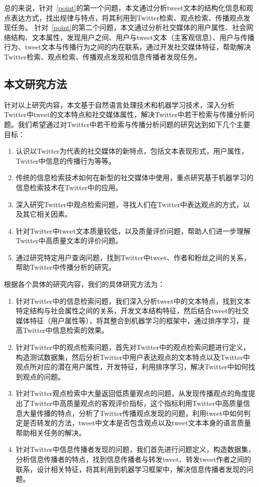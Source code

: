 总的来说，针对~\ref{point}的第一个问题，本文通过分析tweet文本的结构化信息和观点表达方式，找出规律与特点，将其利用到Twitter检索、观点检索、传播观点发现任务。
针对~\ref{point}的第二个问题，本文通过分析社交媒体的用户属性、社会网络结构、文本属性，发现用户之间、用户与tweet文本（主客观信息）、用户与传播行为、tweet文本与传播行为之间的内在联系，通过开发社交媒体特征，帮助解决Twitter检索、观点检索、传播观点发现和信息传播者发现任务。

\subsection{本文研究方法}
针对以上研究内容，本文基于自然语言处理技术和机器学习技术，深入分析Twitter中tweet的文本特点和社交媒体属性，解决Twitter中若干检索与传播分析问题。我们希望通过对Twitter中若干检索与传播分析问题的研究达到如下几个主要目标：
\begin{enumerate}
\item 认识以Twitter为代表的社交媒体的新特点，包括文本表现形式，用户属性，Twitter中信息的传播行为等等。
\item 传统的信息检索技术如何在新型的社交媒体中使用，重点研究基于机器学习的信息检索技术在Twitter中的应用。
\item 深入研究Twitter中观点检索问题，寻找人们在Twitter中表达观点的方式，以及其它相关因素。
\item 针对Twitter中tweet文本质量较低，以及质量评价问题，帮助人们进一步理解Twitter中高质量文本的评价问题。
\item 通过研究特定用户查询问题，找到Twitter中tweet、作者和粉丝之间的关系，帮助Twitter中传播分析的研究。
\end{enumerate}  

根据各个具体的研究内容，我们的具体研究方法为：

\begin{enumerate}
\item 针对Twitter中的信息检索问题，我们深入分析tweet中的文本特点，找到文本特定结构与社会属性之间的关系，开发文本结构特征，然后结合tweet的社交媒体特征（用户属性等），将其整合到机器学习的框架中，通过排序学习，提高Twitter中信息检索的效果。
\item 针对Twitter中的观点检索问题，首先对Twitter中的观点检索问题进行定义，构造测试数据集，然后分析Twitter中用户表达观点的文本特点以及Twitter中观点所对应的潜在用户属性，开发特征，利用排序学习，解决Twitter中如何找到观点的问题。
\item 针对Twitter观点检索中大量返回低质量观点的问题，从发现传播观点的角度提出了Twitter中高质量观点的客观评价指标，这个指标利用Twitter中高质量信息大量传播的特点，分析了Twitter传播观点发现的问题，利用tweet中如何判定是否转发的方法，tweet中文本是否包含观点以及tweet文本本身的语言质量帮助相关任务的解决。
\item  针对Twitter中信息传播者发现的问题，我们首先进行问题定义，构造数据集，分析信息传播者的特点，找到信息传播者与转发tweet、转发tweet作者之间的联系，设计相关特征，将其利用到机器学习框架中，解决信息传播者发现的问题。
\end{enumerate}  

